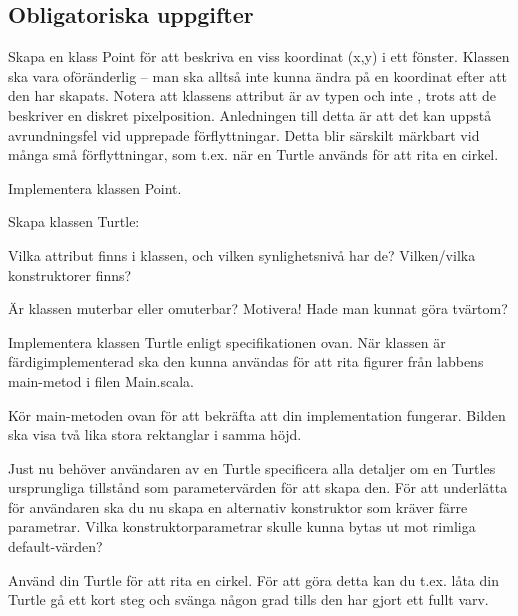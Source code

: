 \clearpage

\subsection{Obligatoriska uppgifter}

\Task Skapa en klass Point för att beskriva en viss koordinat (x,y) i ett fönster. Klassen ska vara oföränderlig -- man ska alltså inte kunna ändra på en koordinat efter att den har skapats. Notera att klassens attribut är av typen  och inte , trots att de beskriver en diskret pixelposition. Anledningen till detta är att det kan uppstå avrundningsfel vid upprepade förflyttningar. Detta blir särskilt märkbart vid många små förflyttningar, som t.ex. när en Turtle används för att rita en cirkel.


\Subtask Implementera klassen Point.

\Task Skapa klassen Turtle:

\vspace{1em} %


\Subtask Vilka attribut finns i klassen, och vilken synlighetsnivå har de? Vilken/vilka konstruktorer finns?

\Subtask Är klassen muterbar eller omuterbar? Motivera! Hade man kunnat göra tvärtom?

\Subtask Implementera klassen Turtle enligt specifikationen ovan. När klassen är färdigimplementerad ska den kunna användas för att rita figurer från labbens main-metod i filen Main.scala.


\Subtask Kör main-metoden ovan för att bekräfta att din implementation fungerar. Bilden ska visa två lika stora rektanglar i samma höjd.

\Subtask Just nu behöver användaren av en Turtle specificera alla detaljer om en Turtles ursprungliga tillstånd som parametervärden för att skapa den. För att underlätta för användaren ska du nu skapa en alternativ konstruktor som kräver färre parametrar. Vilka konstruktorparametrar skulle kunna bytas ut mot rimliga default-värden?

\Subtask Använd din Turtle för att rita en cirkel. För att göra detta kan du t.ex. låta din Turtle gå ett kort steg och svänga någon grad tills den har gjort ett fullt varv.

